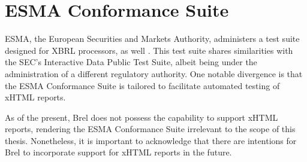 \section{ESMA Conformance Suite}

ESMA, the European Securities and Markets Authority, 
administers a test suite designed for XBRL processors, as well \cite{esma_conformance_suite}. 
This test suite shares similarities with the SEC's Interactive Data Public Test Suite, albeit being under the administration of a different regulatory authority. 
One notable divergence is that the ESMA Conformance Suite is tailored to facilitate automated testing of xHTML reports.

As of the present, Brel does not possess the capability to support xHTML reports, 
rendering the ESMA Conformance Suite irrelevant to the scope of this thesis. 
Nonetheless, it is important to acknowledge that there are intentions for Brel to incorporate support for xHTML reports in the future.
